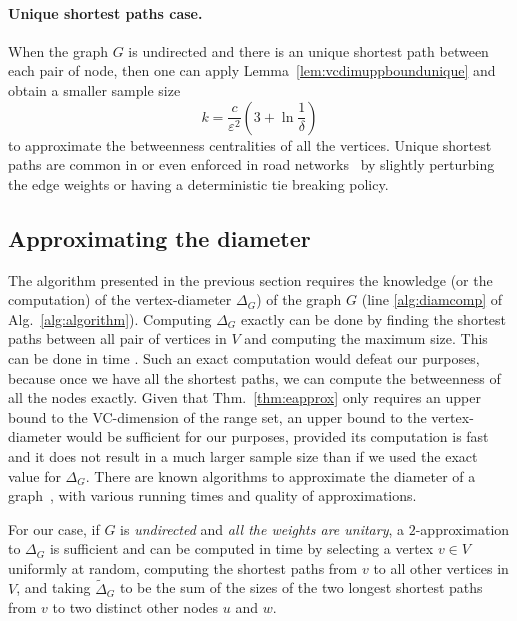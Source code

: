\paragraph{Unique shortest paths case.} When the graph $G$ is undirected and
there is an unique shortest path between each pair of node, then one can apply
Lemma~\ref{lem:vcdimuppboundunique} and obtain a smaller sample size
\[ k= \frac{c}{\varepsilon^2}\left(3+\ln\frac{1}{\delta}\right)
\]
to approximate the betweenness centralities of all the vertices. Unique shortest
paths are common in or even enforced in road networks~\citep{GeisbergerSS08} by
slightly perturbing the edge weights or having a deterministic tie breaking
policy.

\subsection{Approximating the diameter}\label{sec:diam}
The algorithm presented in the previous section requires the knowledge (or the
computation) of the vertex-diameter $\Delta_G$) of the graph $G$ (line
\ref{alg:diamcomp} of Alg.~\ref{alg:algorithm}). Computing $\Delta_G$ exactly
can be done by finding the shortest paths between all pair of vertices in $V$
and computing the maximum size. This can be done in time \XXX. Such an exact
computation would defeat our purposes, because once we have all the shortest
paths, we can compute the betweenness of all the nodes exactly. Given that
Thm.~\ref{thm:eapprox} only requires an upper bound to the VC-dimension of the
range set, an upper bound to the vertex-diameter would be sufficient for our
purposes, provided its computation is fast and it does not result in a much
larger sample size than if we used the exact value for $\Delta_G$. There are
known algorithms to approximate the diameter of a
graph~\citep{AingwordCIM99,BoitmanisFL06,RodittyW12}, with various running times
and quality of approximations.

For our case, if $G$ is \emph{undirected} and \emph{all the weights are
unitary}, a $2$-approximation to $\Delta_G$ is sufficient and can be computed in
time \XXX by selecting a vertex $v\in V$ uniformly at random, computing the
shortest paths from $v$ to all other vertices in $V$, and taking
$\tilde\Delta_G$ to be the sum of the sizes of the two longest shortest paths
from $v$ to two distinct other nodes $u$ and $w$. 

